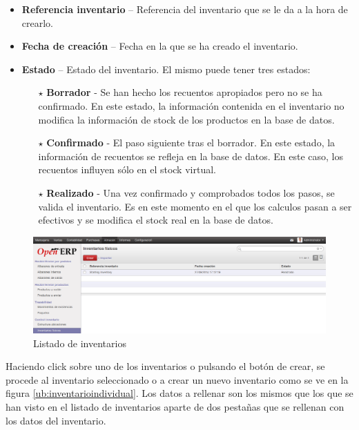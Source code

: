 \begin{itemize}
  \item \textbf{Referencia inventario} -- Referencia del inventario que se le da a la hora de crearlo.
  \item \textbf{Fecha de creación} -- Fecha en la que se ha creado el inventario.
  \item \textbf{Estado} -- Estado del inventario. El mismo puede tener tres estados:
    \begin{itemize}
      \item[$\star$] \textbf{Borrador} - Se han hecho los recuentos apropiados pero no se ha confirmado. En este estado, la información contenida
                                         en el inventario no modifica la información de stock de los productos en la base de datos.
      \item[$\star$] \textbf{Confirmado} - El paso siguiente tras el borrador. En este estado, la información de recuentos se refleja en la base de
                                           datos. En este caso, los recuentos influyen sólo en el stock virtual.
      \item[$\star$] \textbf{Realizado} - Una vez confirmado y comprobados todos los pasos, se valida el inventario. Es en este momento en el que
                                          los calculos pasan a ser efectivos y se modifica el stock real en la base de datos.
    \end{itemize}
\end{itemize}

\begin{figure}[H]
\includegraphics[width=\textwidth]{almacen/img/inv_lista.png}
\caption{Listado de inventarios}
\label{ub:inventariolista}
\end{figure}	

Haciendo click sobre uno de los inventarios o pulsando el botón de crear, se procede al inventario seleccionado o a crear un nuevo inventario como se
ve en la figura \ref{ub:inventarioindividual}. Los datos a rellenar son los mismos que los que se han visto en el listado de inventarios aparte de dos
pestañas que se rellenan con los datos del inventario.

